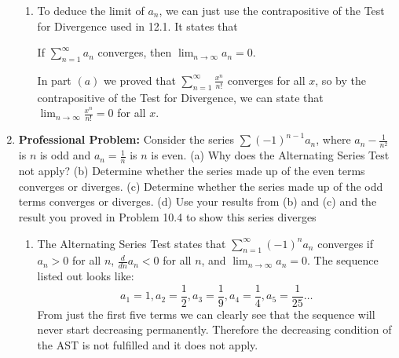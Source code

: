 \documentclass{article}
\begin{document}
\begin{enumerate}[label=\textbf{(12.\arabic*)}]
\begin{enumerate}
\item To deduce the limit of $a_n$, we can just use the contrapositive of the Test for Divergence used in 12.1. It states that
\begin{center}
\vspace{-20pt}
If $\displaystyle \sum_{n=1}^\infty a_n$ converges, then $\displaystyle \lim_{n\to\infty} a_n=0$.
\end{center}
In part $(a)$ we proved that $\displaystyle \sum_{n=1}^\infty \frac{x^n}{n!}$ converges for all $x$, so by the contrapositive of the Test for Divergence, we can state that $\displaystyle \lim_{n\to\infty} \frac{x^n}{n!} = 0$ for all $x$.
\end{enumerate}

\newpage

\item \textbf{Professional Problem:} Consider the series $ \sum \left(-1\right)^{n-1}a_n$, where $a_n-\frac{1}{n^2}$ is $n$ is odd and $a_n = \frac{1}{n}$ is $n$ is even. 
(a) Why does the Alternating Series Test not apply?
(b) Determine whether the series made up of the even terms converges or diverges.
(c) Determine whether the series made up of the odd terms converges or diverges.
(d) Use your results from (b) and (c) and the result you proved in Problem 10.4 to show this series diverges

\begin{enumerate}
\item The Alternating Series Test states that $\sum_{n=1}^\infty (-1)^na_n$ converges if $a_n>0$ for all $n$, $\frac{d}{dn}a_n<0$ for all $n$,
and $\displaystyle \lim_{n\to\infty} a_n=0$.
The sequence listed out looks like:
\[a_1 = 1,a_2=\frac{1}{2},a_3=\frac{1}{9},a_4=\frac{1}{4},a_5=\frac{1}{25}\ldots\]
From just the first five terms we can clearly see that the sequence will never start decreasing permanently. Therefore the decreasing condition of the AST is not fulfilled and it does not apply.


\end{enumerate}
\end{enumerate}
\end{document}
